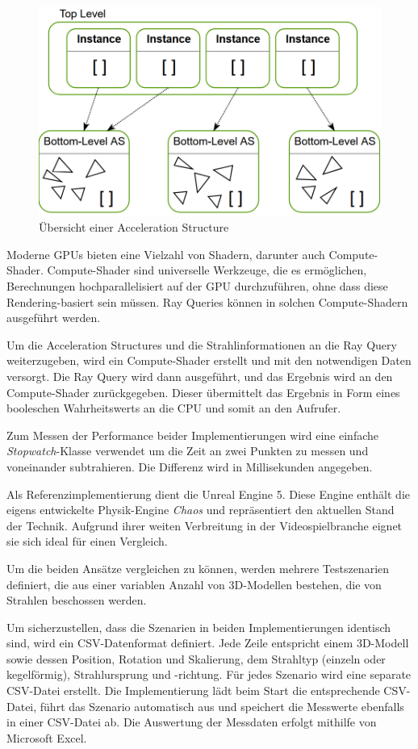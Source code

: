 \documentclass[11pt]{scrartcl}
\begin{document}
{	\begin{figure}[h]
		\centering
		\includegraphics[width=0.7\linewidth]{Figures/acceleration_structures}
		\caption[Acceleration Structure]{Übersicht einer Acceleration Structure\cite{Bickford}}
		\label{fig:accelerationstructure}
	\end{figure}
	
	
	Moderne GPUs bieten eine Vielzahl von Shadern, darunter auch Compute-Shader. Compute-Shader sind universelle Werkzeuge, die es ermöglichen, Berechnungen hochparallelisiert auf der GPU durchzuführen, ohne dass diese Rendering-basiert sein müssen. Ray Queries können in solchen Compute-Shadern ausgeführt werden.
	
	Um die Acceleration Structures und die Strahlinformationen an die Ray Query weiterzugeben, wird ein Compute-Shader erstellt und mit den notwendigen Daten versorgt. Die Ray Query wird dann ausgeführt, und das Ergebnis wird an den Compute-Shader zurückgegeben. Dieser übermittelt das Ergebnis in Form eines booleschen Wahrheitswerts an die CPU und somit an den Aufrufer.
	
	Zum Messen der Performance beider Implementierungen wird eine einfache \textit{Stopwatch}-Klasse verwendet um die Zeit an zwei Punkten zu messen und voneinander subtrahieren. Die Differenz wird in Millisekunden angegeben.
	
	Als Referenzimplementierung dient die Unreal Engine 5. Diese Engine enthält die eigens entwickelte Physik-Engine \textit{Chaos} und repräsentiert den aktuellen Stand der Technik. Aufgrund ihrer weiten Verbreitung in der Videospielbranche eignet sie sich ideal für einen Vergleich.
	
	Um die beiden Ansätze vergleichen zu können, werden mehrere Testszenarien definiert, die aus einer variablen Anzahl von 3D-Modellen bestehen, die von Strahlen beschossen werden.

	Um sicherzustellen, dass die Szenarien in beiden Implementierungen identisch sind, wird ein CSV-Datenformat definiert. Jede Zeile entspricht einem 3D-Modell sowie dessen Position, Rotation und Skalierung, dem Strahltyp (einzeln oder kegelförmig), Strahlursprung und -richtung. Für jedes Szenario wird eine separate CSV-Datei erstellt. Die Implementierung lädt beim Start die entsprechende CSV-Datei, führt das Szenario automatisch aus und speichert die Messwerte ebenfalls in einer CSV-Datei ab. Die Auswertung der Messdaten erfolgt mithilfe von Microsoft Excel.
	
}
\end{document}
